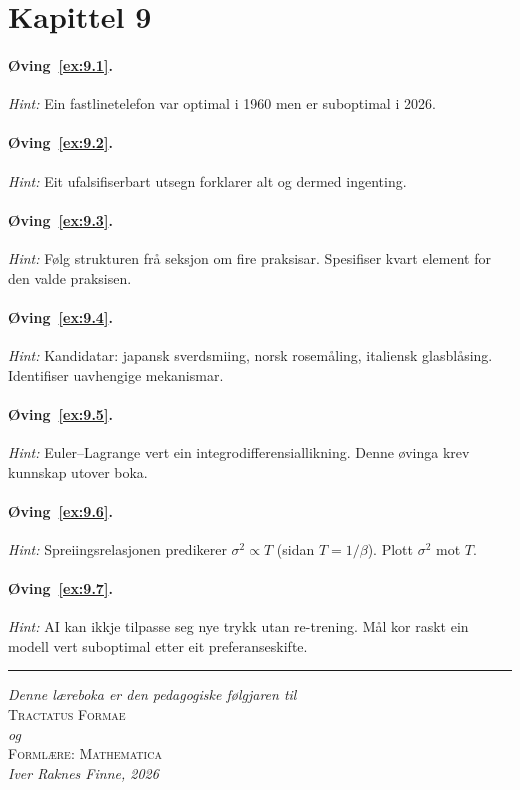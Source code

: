 \section*{Kapittel 9}

\paragraph{Øving~\ref{ex:9.1}.}
\emph{Hint:} Ein fastlinetelefon var optimal i 1960 men er
suboptimal i 2026.

\paragraph{Øving~\ref{ex:9.2}.}
\emph{Hint:} Eit ufalsifiserbart utsegn forklarer alt og dermed
ingenting.

\paragraph{Øving~\ref{ex:9.3}.}
\emph{Hint:} Følg strukturen frå seksjon om fire praksisar.
Spesifiser kvart element for den valde praksisen.

\paragraph{Øving~\ref{ex:9.4}.}
\emph{Hint:} Kandidatar: japansk sverdsmiing, norsk rosemåling,
italiensk glasblåsing. Identifiser uavhengige mekanismar.

\paragraph{Øving~\ref{ex:9.5}.}
\emph{Hint:} Euler--Lagrange vert ein integrodifferensiallikning.
Denne øvinga krev kunnskap utover boka.

\paragraph{Øving~\ref{ex:9.6}.}
\emph{Hint:} Spreiingsrelasjonen predikerer $\sigma^2 \propto T$
(sidan $T = 1/\beta$). Plott $\sigma^2$ mot $T$.

\paragraph{Øving~\ref{ex:9.7}.}
\emph{Hint:} AI kan ikkje tilpasse seg nye trykk utan re-trening.
Mål kor raskt ein modell vert suboptimal etter eit preferanseskifte.



\vfill
\begin{center}
\rule{4cm}{0.4pt}

\medskip
{\small\itshape Denne læreboka er den pedagogiske følgjaren til}\\
{\small\scshape Tractatus Formae}\\
{\small\itshape og}\\
{\small\scshape Formlære: Mathematica}\\[6pt]
{\small\itshape Iver Raknes Finne, 2026}
\end{center}
